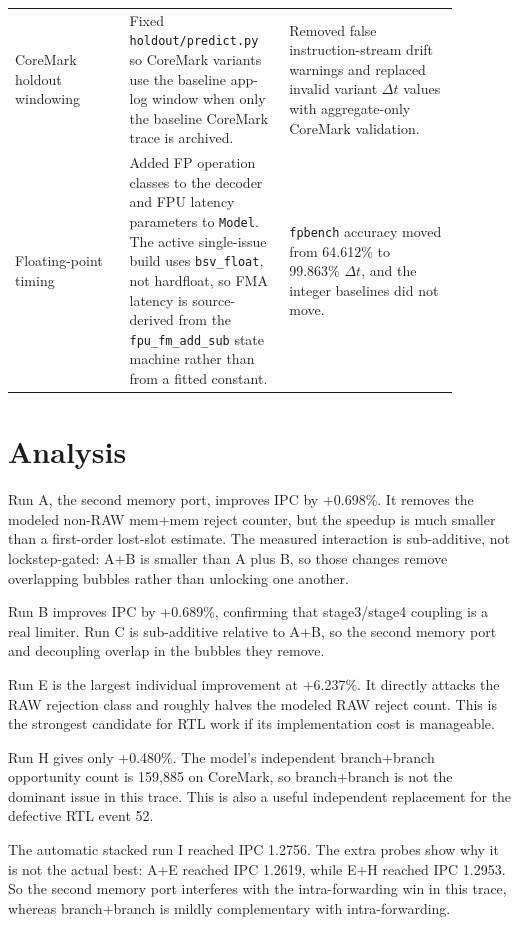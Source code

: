 \documentclass[10pt]{article}
\begin{document}
\begin{longtable}{@{}p{0.23\linewidth}p{0.31\linewidth}p{0.34\linewidth}@{}}
CoreMark holdout windowing & Fixed \texttt{holdout/predict.py} so CoreMark
variants use the baseline app-log window when only the baseline CoreMark trace
is archived. & Removed false instruction-stream drift warnings and replaced
invalid variant $\Delta t$ values with aggregate-only CoreMark validation. \\
Floating-point timing & Added FP operation classes to the decoder and FPU
latency parameters to \texttt{Model}. The active single-issue build uses
\texttt{bsv\_float}, not hardfloat, so FMA latency is source-derived from the
\texttt{fpu\_fm\_add\_sub} state machine rather than from a fitted constant. &
\texttt{fpbench} accuracy moved from 64.612\% to 99.863\% $\Delta t$, and the
integer baselines did not move. \\
\bottomrule
\end{longtable}

\section*{Analysis}

Run A, the second memory port, improves IPC by +0.698\%.
It removes the modeled non-RAW mem+mem reject counter, but the speedup is much
smaller than a first-order lost-slot estimate. The measured interaction is
sub-additive, not lockstep-gated: A+B is smaller than A plus B, so those changes
remove overlapping bubbles rather than unlocking one another.

Run B improves IPC by +0.689\%, confirming
that stage3/stage4 coupling is a real limiter. Run C is sub-additive relative to
A+B, so the second memory port and decoupling overlap in the bubbles they remove.

Run E is the largest individual improvement at +6.237\%.
It directly attacks the RAW rejection class and roughly halves the modeled RAW
reject count. This is the strongest candidate for RTL work if its implementation
cost is manageable.

Run H gives only +0.480\%. The model's
independent branch+branch opportunity count is 159,885
on CoreMark, so branch+branch is not the dominant issue in this trace. This is
also a useful independent replacement for the defective RTL event 52.

The automatic stacked run I reached IPC 1.2756.
The extra probes show why it is not the actual best: A+E reached IPC
1.2619, while
E+H reached IPC 1.2953.
So the second memory port interferes with the intra-forwarding win in this trace,
whereas branch+branch is mildly complementary with intra-forwarding.
\end{document}
